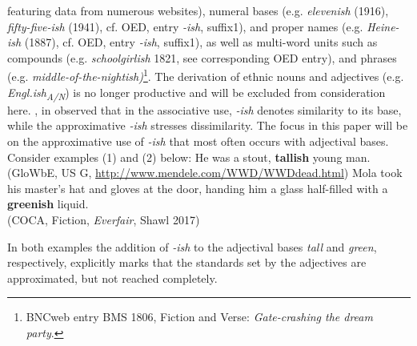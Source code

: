 \documentclass[output=paper
,modfonts
,nonflat]{langsci/langscibook}
\begin{document}
featuring data from numerous websites), numeral bases (e.g.  \textit{elevenish} (1916),  \textit{fifty-five-ish} (1941), cf. OED, entry \textit{-ish}, suffix1), and proper names (e.g.  \textit{Heine-ish} (1887), cf. OED, entry \textit{-ish}, suffix1), as well as multi-word units such as compounds (e.g.  \textit{schoolgirlish} 1821, see corresponding OED entry), and phrases (e.g.  \textit{middle-of-the-nightish)}\footnote{BNCweb entry \cite{BNCweb} BMS 1806, Fiction and Verse: \textit{Gate-crashing the dream party}.}. The derivation of ethnic nouns and adjectives (e.g.  \textit{Engl.ish\textsubscript{A/N}}) is no longer productive and will be excluded from consideration here. \textcite{Kuzmack2007}, in \textcite*[234]{Traugott2013} observed that in the associative use,  \textit{-ish} denotes similarity to its base, while the approximative  \textit{-ish} stresses dissimilarity. The focus in this paper will be on the approximative use of  \textit{-ish} that most often occurs with adjectival bases. Consider examples (1) and (2) below:
\ea
	He was a stout, \textbf{tallish} young man. \\ (GloWbE, US G, \url{http://www.mendele.com/WWD/WWDdead.html})
\z
\ea
	Mola took his master's hat and gloves at the door, handing him a glass half-filled with a \textbf{greenish} liquid. \\ (COCA, Fiction, \textit{Everfair}, Shawl 2017)
\z

In both examples the addition of \textit{-ish} to the adjectival bases  \textit{tall} and  \textit{green}, respectively, explicitly marks that the standards set by the adjectives are approximated, but not reached completely.
\end{document}
